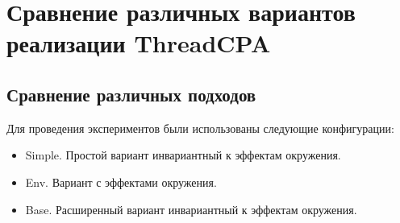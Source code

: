 %  
%  
%  

\section{Сравнение различных вариантов реализации ThreadCPA}

\subsection{Сравнение различных подходов }

Для проведения экспериментов были использованы следующие конфигурации:

\begin{itemize}
\item Simple. Простой вариант инвариантный к эффектам окружения.
\item Env. Вариант с эффектами окружения.
\item Base. Расширенный вариант инвариантный к эффектам окружения.
\end{itemize}

